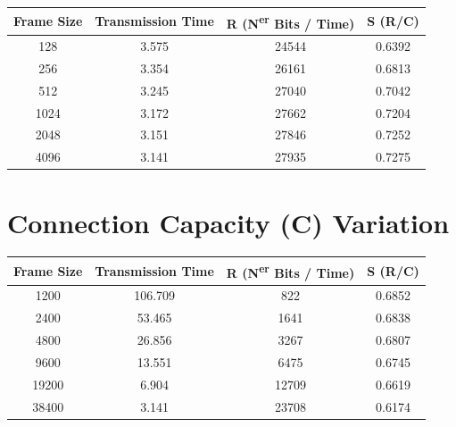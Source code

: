\documentclass[11pt]{report}
\begin{document}
\begin{center}
\begin{tabular}{ |c|c|c|c| } 
\hline
Frame Size & Transmission Time & R (N\textsuperscript{er} Bits / Time) & S (R/C)  \\
\hline
128 & 3.575 & 24544 & 0.6392 \\
256 & 3.354 & 26161 & 0.6813 \\
512 & 3.245 & 27040 & 0.7042 \\
1024 & 3.172 & 27662 & 0.7204 \\
2048 & 3.151 & 27846 & 0.7252 \\
4096 & 3.141 & 27935 & 0.7275 \\
\hline
\end{tabular}
\end{center}

\section{Connection Capacity (C) Variation}


\begin{center}
\begin{tabular}{ |c|c|c|c| } 
\hline
Frame Size & Transmission Time & R (N\textsuperscript{er} Bits / Time) & S (R/C)  \\
\hline
1200 & 106.709 & 822 & 0.6852 \\
2400 & 53.465 & 1641 & 0.6838 \\
4800 & 26.856 & 3267 & 0.6807 \\
9600 & 13.551 & 6475 & 0.6745 \\
19200 & 6.904 & 12709 & 0.6619 \\
38400 & 3.141 & 23708 & 0.6174 \\
\hline
\end{tabular}
\end{center}
\end{document}
